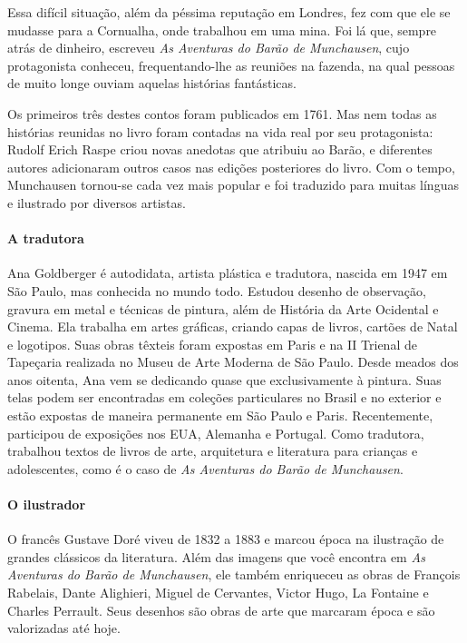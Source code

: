 \documentclass[11pt]{extarticle}
\begin{document}
Essa difícil situação, além da péssima reputação em Londres, fez com que ele se mudasse para a Cornualha, onde trabalhou em uma mina. Foi lá que, sempre atrás de dinheiro, escreveu \textit{As Aventuras do Barão de Munchausen}, cujo protagonista conheceu, frequentando-lhe as reuniões na fazenda, na qual pessoas de muito longe ouviam aquelas histórias fantásticas. 

Os primeiros três destes contos foram publicados em 1761. Mas nem todas as histórias reunidas no livro foram contadas na vida real por seu protagonista: Rudolf Erich Raspe criou novas anedotas que atribuiu ao Barão, e diferentes autores adicionaram outros casos nas edições posteriores do livro. Com o tempo, Munchausen tornou-se cada vez mais popular e foi traduzido para muitas línguas e ilustrado por diversos artistas.


\paragraph{A tradutora}
Ana Goldberger é autodidata, artista plástica e tradutora, nascida em 1947 em São Paulo, mas conhecida no mundo todo. Estudou desenho de observação, gravura em metal e técnicas de pintura, além de História da Arte Ocidental e Cinema. Ela trabalha em artes gráficas, criando capas de livros, cartões de Natal e logotipos. Suas obras têxteis foram expostas em Paris e na II Trienal de Tapeçaria realizada no Museu de Arte Moderna de São Paulo. Desde meados dos anos oitenta, Ana vem se dedicando quase que exclusivamente à pintura. Suas telas podem ser encontradas em coleções particulares no Brasil e no exterior e estão expostas de maneira permanente em São Paulo e Paris. Recentemente, participou de exposições nos EUA, Alemanha e Portugal. Como tradutora, trabalhou textos de livros de arte, arquitetura e literatura para crianças e adolescentes, como é o caso de \textit{As Aventuras do Barão de Munchausen}.

\paragraph{O ilustrador}

O francês Gustave Doré viveu de 1832 a 1883 e marcou época na ilustração de grandes clássicos da literatura. Além das imagens que você encontra em \textit{As Aventuras do Barão de Munchausen}, ele também enriqueceu as obras de François Rabelais, Dante Alighieri, Miguel de Cervantes, Victor Hugo, La Fontaine e Charles Perrault. Seus desenhos são obras de arte que marcaram época e são valorizadas até hoje. 
\end{document}
